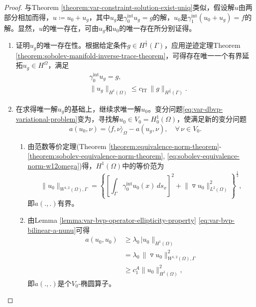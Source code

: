 \begin{proof}
  与Theorem \ref{theorem:var-constraint-solution-exist-uniq}类似，假设解$u$由两部分相加而得，$u \coloneqq u_0 + u_g$，其中$u_g$是$\gamma_0^{\text{int}} u_g = g$的解，$u_0$是$\gamma_1^{\text{int}} (u_0 + u_g) = f$的解。显然，$u$的唯一存在，可由$u_g$和$u_0$的唯一存在所分别证得。
\begin{enumerate}
  \item 证明$u_g$的唯一存在性。根据给定条件$g \in H^{\frac{1}{2}}(\Gamma)$，应用逆迹定理Theorem \ref{theorem:sobolev-manifold-inverse-trace-theorem}，可得存在唯一一个有界延拓$u_g \in H^{\Omega}$，满足
  \begin{equation*}
    \begin{split}
      & \gamma_{0}^{\text{int}} u_g = g, \\
      & \big\| u_g \big\|_{H^{1}(\Omega)} \le c_{\text{IT}} \, \big\| g \big\|_{H^{\frac{1}{2}}(\Gamma)}.
    \end{split}
  \end{equation*}

  \item 在求得唯一解$u_g$的基础上，继续求唯一解$u_0$。变分问题\eqref{eq:var-dbvp-variational-problem}变为，寻找解$u_0 \in V_0 = H_{0}^{1}(\Omega)$，使满足新的变分问题
  \begin{equation}
    \label{eq:var-dbvp-variational-problem-u0}
    a(u_0, \nu) = \langle f, \nu \rangle_{\Omega} - a (u_g, \nu), \quad \forall \, \nu \in V_0.
  \end{equation}
  \begin{enumerate}
    \item 由范数等价定理(Theorem \ref{theorem:equivalence-norm-theorem}-\ref{theorem:sobolev-equivalence-norm-theorem}, \eqref{eq:sobolev-equivalence-norm-w12omega})得，$H^{1}(\Omega)$中的等价范为
    \begin{equation*}
        \big\| u_0 \big\|_{W^{1,2}(\Omega), \Gamma} = \left\{
      \left[
      \int_{\Gamma} \gamma_{0}^{\text{int}} u_0(x) \, ds_x
      \right]^2
      + \big\| \triangledown u_0 \big\|^2_{L^2(\Omega)}
       \right\}^{\frac{1}{2}},
    \end{equation*}
    即$a(.,.)$有界。

    \item 由Lemma \ref{lemma:var-bvp-operator-ellipticity-property} \eqref{eq:var-bvp-bilinear-a-nunu}可得
    \begin{equation}
      \label{eq:var-bvp-operator-a-ellipticity}
      \begin{split}
        a(u_0,u_0) &\ge \lambda_0 \, \big| u_0 \big\|_{H^{1}(\Omega)} \\
        &= \lambda_0 \, \big\| \triangledown u_0 \big\|_{W^{1,2}(\Omega), \Gamma}^2 \\
        &\ge c_1^A \big\| u_0 \big\|_{H^1(\Omega)}^2,
      \end{split}
    \end{equation}
    即$a(.,.)$是个$V_0$-椭圆算子。


\end{enumerate}
\end{enumerate}
\end{proof}

